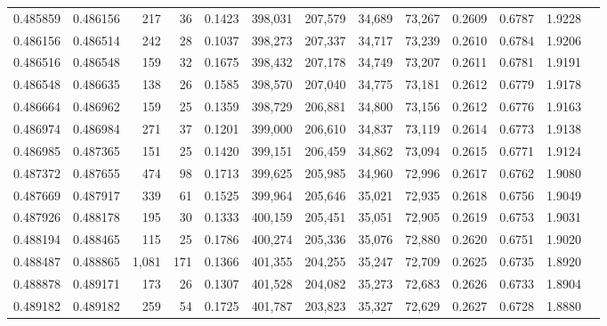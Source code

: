 \begin{tabular}{rrrrrrrrrrrrr}
0.485859 & 0.486156 &   217 &  36 &                                     0.1423 & 398,031 & 207,579 &  34,689 &  73,267 & 0.2609 & 0.6787 & 1.9228 \\
0.486156 & 0.486514 &   242 &  28 &                                     0.1037 & 398,273 & 207,337 &  34,717 &  73,239 & 0.2610 & 0.6784 & 1.9206 \\
0.486516 & 0.486548 &   159 &  32 &                                     0.1675 & 398,432 & 207,178 &  34,749 &  73,207 & 0.2611 & 0.6781 & 1.9191 \\
0.486548 & 0.486635 &   138 &  26 &                                     0.1585 & 398,570 & 207,040 &  34,775 &  73,181 & 0.2612 & 0.6779 & 1.9178 \\
0.486664 & 0.486962 &   159 &  25 &                                     0.1359 & 398,729 & 206,881 &  34,800 &  73,156 & 0.2612 & 0.6776 & 1.9163 \\
0.486974 & 0.486984 &   271 &  37 &                                     0.1201 & 399,000 & 206,610 &  34,837 &  73,119 & 0.2614 & 0.6773 & 1.9138 \\
0.486985 & 0.487365 &   151 &  25 &                                     0.1420 & 399,151 & 206,459 &  34,862 &  73,094 & 0.2615 & 0.6771 & 1.9124 \\
0.487372 & 0.487655 &   474 &  98 &                                     0.1713 & 399,625 & 205,985 &  34,960 &  72,996 & 0.2617 & 0.6762 & 1.9080 \\
0.487669 & 0.487917 &   339 &  61 &                                     0.1525 & 399,964 & 205,646 &  35,021 &  72,935 & 0.2618 & 0.6756 & 1.9049 \\
0.487926 & 0.488178 &   195 &  30 &                                     0.1333 & 400,159 & 205,451 &  35,051 &  72,905 & 0.2619 & 0.6753 & 1.9031 \\
0.488194 & 0.488465 &   115 &  25 &                                     0.1786 & 400,274 & 205,336 &  35,076 &  72,880 & 0.2620 & 0.6751 & 1.9020 \\
0.488487 & 0.488865 & 1,081 & 171 &                                     0.1366 & 401,355 & 204,255 &  35,247 &  72,709 & 0.2625 & 0.6735 & 1.8920 \\
0.488878 & 0.489171 &   173 &  26 &                                     0.1307 & 401,528 & 204,082 &  35,273 &  72,683 & 0.2626 & 0.6733 & 1.8904 \\
0.489182 & 0.489182 &   259 &  54 &                                     0.1725 & 401,787 & 203,823 &  35,327 &  72,629 & 0.2627 & 0.6728 & 1.8880 \\

\end{tabular}
